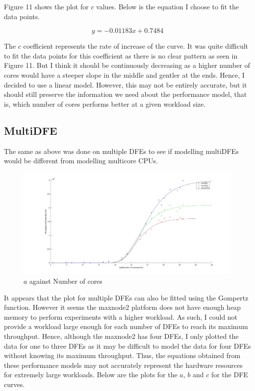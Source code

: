 \documentclass[a4paper,11pt]{article}
\begin{document}
\noindent Figure 11 shows the plot for $c$ values. Below is the equation I choose to fit the data points.

\begin{equation}
y=-0.01183x + 0.7484
\end{equation}

\noindent The $c$ coefficient represents the rate of increase of the curve. It was quite difficult to fit the data points for this coefficient as there is no clear pattern as seen in Figure 11. But I think it should be continuously decreasing as a higher number of cores would have a steeper slope in the middle and gentler at the ends. Hence, I decided to use a linear model. However, this may not be entirely accurate, but it should still preserve the information we need about the performance model, that is, which number of cores performs better at a given workload size.

\subsection{MultiDFE}
The same as above was done on multiple DFEs to see if modelling multiDFEs would be different from modelling multicore CPUs.

\begin{figure}[H]
	\hspace{-2.8cm}
	\includegraphics[scale=0.3]{images/multidfe}
	\caption{$a$ against Number of cores}
\end{figure}

\noindent It appears that the plot for multiple DFEs can also be fitted using the Gompertz function. However it seems the maxnode2 platform does not have enough heap memory to perform experiments with a higher workload. As such, I could not provide a workload large enough for each number of DFEs to reach its maximum throughput. Hence, although the maxnode2 has four DFEs, I only plotted the data for one to three DFEs as it may be difficult to model the data for four DFEs without knowing its maximum throughput. Thus, the equations obtained from these performance models may not accurately represent the hardware resources for extremely large workloads. Below are the plots for the $a$, $b$ and $c$ for the DFE curves. 
\end{document}
